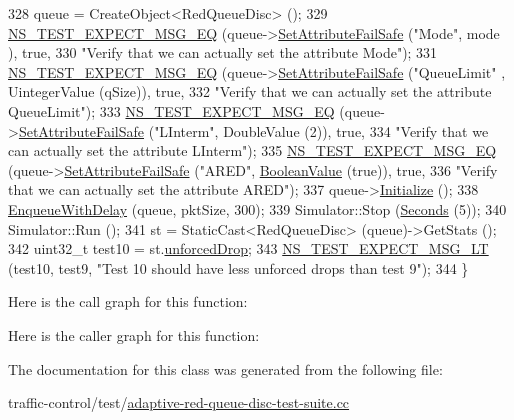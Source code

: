 \begin{DoxyCode}
328   queue = CreateObject<RedQueueDisc> ();
329   \hyperlink{group__testing_ga7304ba46a28d8cf08dfdfd6499cf7068}{NS\_TEST\_EXPECT\_MSG\_EQ} (queue->\hyperlink{classns3_1_1ObjectBase_aa7d333004e970f925a4ed5df275541b5}{SetAttributeFailSafe} (\textcolor{stringliteral}{"Mode"}, mode
      ), \textcolor{keyword}{true},
330                          \textcolor{stringliteral}{"Verify that we can actually set the attribute Mode"});
331   \hyperlink{group__testing_ga7304ba46a28d8cf08dfdfd6499cf7068}{NS\_TEST\_EXPECT\_MSG\_EQ} (queue->\hyperlink{classns3_1_1ObjectBase_aa7d333004e970f925a4ed5df275541b5}{SetAttributeFailSafe} (\textcolor{stringliteral}{"QueueLimit"}
      , UintegerValue (qSize)), \textcolor{keyword}{true},
332                          \textcolor{stringliteral}{"Verify that we can actually set the attribute QueueLimit"});
333   \hyperlink{group__testing_ga7304ba46a28d8cf08dfdfd6499cf7068}{NS\_TEST\_EXPECT\_MSG\_EQ} (queue->\hyperlink{classns3_1_1ObjectBase_aa7d333004e970f925a4ed5df275541b5}{SetAttributeFailSafe} (\textcolor{stringliteral}{"LInterm"}, 
      DoubleValue (2)), \textcolor{keyword}{true},
334                          \textcolor{stringliteral}{"Verify that we can actually set the attribute LInterm"});
335   \hyperlink{group__testing_ga7304ba46a28d8cf08dfdfd6499cf7068}{NS\_TEST\_EXPECT\_MSG\_EQ} (queue->\hyperlink{classns3_1_1ObjectBase_aa7d333004e970f925a4ed5df275541b5}{SetAttributeFailSafe} (\textcolor{stringliteral}{"ARED"}, 
      \hyperlink{classns3_1_1BooleanValue}{BooleanValue} (\textcolor{keyword}{true})), \textcolor{keyword}{true},
336                          \textcolor{stringliteral}{"Verify that we can actually set the attribute ARED"});
337   queue->\hyperlink{classns3_1_1Object_af4411cb29971772fcd09203474a95078}{Initialize} ();
338   \hyperlink{classAredQueueDiscTestCase_a79ce3b6eab6abac51c635056d58b6d8b}{EnqueueWithDelay} (queue, pktSize, 300);
339   Simulator::Stop (\hyperlink{group__timecivil_ga33c34b816f8ff6628e33d5c8e9713b9e}{Seconds} (5));
340   Simulator::Run ();
341   st = StaticCast<RedQueueDisc> (queue)->GetStats ();
342   uint32\_t test10 = st.\hyperlink{structns3_1_1RedQueueDisc_1_1Stats_a242027f6eb7d30e2cd636c52080e2c73}{unforcedDrop};
343   \hyperlink{group__testing_ga5e7f81b9d00df9c727e6281e1b1bbc55}{NS\_TEST\_EXPECT\_MSG\_LT} (test10, test9, \textcolor{stringliteral}{"Test 10 should have less unforced drops than
       test 9"});
344 \}
\end{DoxyCode}


Here is the call graph for this function\+:




Here is the caller graph for this function\+:




The documentation for this class was generated from the following file\+:\begin{DoxyCompactItemize}
\item 
traffic-\/control/test/\hyperlink{adaptive-red-queue-disc-test-suite_8cc}{adaptive-\/red-\/queue-\/disc-\/test-\/suite.\+cc}\end{DoxyCompactItemize}
